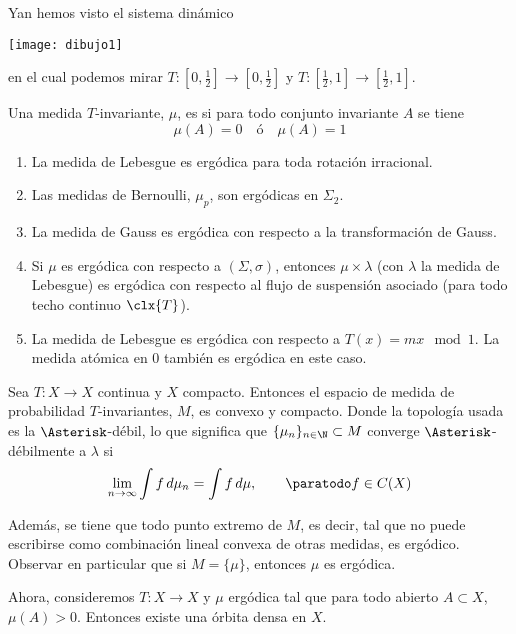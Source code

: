\documentclass[	docname= Sistemas\ Din\'amicos,
				finished=1,
				semester=1,
				year=2017,
				professor=Godofredo\ Iommi,
				sigla=MAT2565]{apunte}
\begin{document}
\begin{ex} Yan hemos visto el sistema dinámico
	\begin{center}
		\texttt{[image: dibujo1]}
	\end{center}

en el cual podemos mirar $T: \left[0,\frac{1}{2}\right] \to \left[0,\frac{1}{2}\right]$ y $T: \left[\frac{1}{2}, 1\right] \to \left[\frac{1}{2}, 1\right]$.
\end{ex}

\begin{defn} Una medida $T$-invariante, $\mu$, es  si para todo conjunto invariante $A$ se tiene
	$$\mu(A) = 0 \quad \text{ó} \quad \mu(A) = 1$$
\end{defn}

\begin{ex} \quad
\begin{enumerate}[\indent 1)]
	\item La medida de Lebesgue es ergódica para toda rotación irracional.
	\item Las medidas de Bernoulli, $\mu_{p}$, son ergódicas en $\Sigma_{2}$.
	\item La medida de Gauss es ergódica con respecto a la transformación de Gauss.
	\item Si $\mu$ es ergódica con respecto a $(\Sigma, \sigma)$, entonces $\mu \times \lambda$ (con $\lambda$ la medida de Lebesgue) es ergódica con respecto al flujo de suspensión asociado (para todo techo continuo $\clx{T}$).
	\item La medida de Lebesgue es ergódica con respecto a $T(x) = mx \mod 1$. La medida atómica en 0 también es ergódica en este caso.
\end{enumerate}
\end{ex}

Sea $T: X \to X$ continua y $X$ compacto. Entonces el espacio de medida de probabilidad $T$-invariantes, $M$, es convexo y compacto. Donde la topología usada es la $\Asterisk$-débil, lo que significa que $\{\mu_{n}\}_{n \in \N} \subset M$ converge $\Asterisk$-débilmente a $\lambda$ si
	$$\lim_{n \to \infty} \int f \, d\mu_{n} = \int f \, d\mu, \qquad \paratodo f \in C(X)$$

Además, se tiene que todo punto extremo de $M$, es decir, tal que no puede escribirse como combinación lineal convexa de otras medidas, es ergódico. Observar en particular que si $M = \{\mu\}$, entonces $\mu$ es ergódica.

Ahora, consideremos $T: X \to X$ y $\mu$ ergódica tal que para todo abierto $A \subset X$, $\mu(A) > 0$. Entonces existe una órbita densa en $X$.
\end{document}
